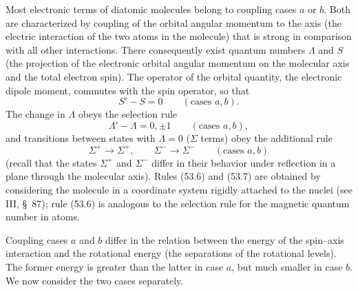 Most electronic terms of diatomic molecules belong to coupling cases $a$ or $b$. Both are characterized by coupling of the orbital angular momentum to the axis (the electric interaction of the two atoms in the molecule) that is strong in comparison with all other interactions. There consequently exist quantum numbers $\Lambda$ and $S$ (the projection of the electronic orbital angular momentum on the molecular axis and the total electron spin). The operator of the orbital quantity, the electronic dipole moment, commutes with the spin operator, so that
\begin{equation}
S'-S=0\qquad(\text{cases }a,b).
\tag{53.5}
\end{equation}
The change in $\Lambda$ obeys the selection rule
\begin{equation}
\Lambda'-\Lambda=0,\pm1\qquad(\text{cases }a,b),
\tag{53.6}
\end{equation}
and transitions between states with $\Lambda=0$ ($\Sigma$ terms) obey the additional rule
\begin{equation}
\Sigma^+\to\Sigma^+,\qquad \Sigma^-\to\Sigma^-\qquad(\text{cases }a,b)
\tag{53.7}
\end{equation}
(recall that the states $\Sigma^+$ and $\Sigma^-$ differ in their behavior under reflection in a plane through the molecular axis). Rules (53.6) and (53.7) are obtained by considering the molecule in a coordinate system rigidly attached to the nuclei (see III, \S~87); rule (53.6) is analogous to the selection rule for the magnetic quantum number in atoms.

Coupling cases $a$ and $b$ differ in the relation between the energy of the spin--axis interaction and the rotational energy (the separations of the rotational levels). The former energy is greater than the latter in case $a$, but much smaller in case $b$. We now consider the two cases separately.

